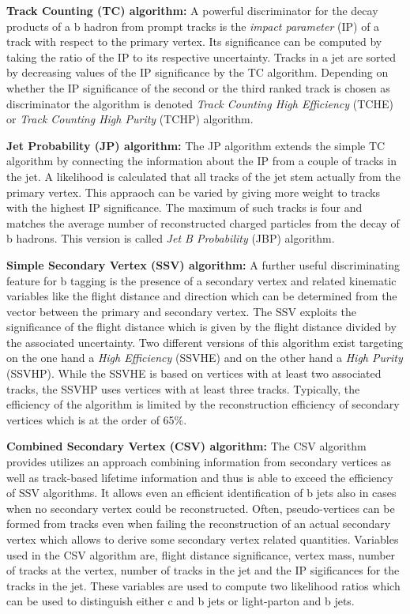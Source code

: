 \begin{description}
 \item \textbf{Track Counting (TC) algorithm:} A powerful discriminator for the decay products of a b hadron from prompt tracks is the \textit{impact parameter} (IP) of a track with respect to the primary vertex. Its significance can be computed by taking the ratio of the IP to its respective uncertainty. Tracks in a jet are sorted by decreasing values of the IP significance by the TC algorithm. Depending on whether the IP significance of the second or the third ranked track is chosen as discriminator the algorithm is denoted \textit{Track Counting High Efficiency} (TCHE) or \textit{Track Counting High Purity} (TCHP) algorithm. 
 \item \textbf{Jet Probability (JP) algorithm:} The JP algorithm extends the simple TC algorithm by connecting the information about the IP from a couple of tracks in the jet. A likelihood is calculated that all tracks of the jet stem actually from the primary vertex. This appraoch can be varied by giving more weight to tracks with the highest IP significance. The maximum of such tracks is four and matches the average number of reconstructed charged particles from the decay of b hadrons. This version is called \textit{Jet B Probability} (JBP) algorithm.
 \item \textbf{Simple Secondary Vertex (SSV) algorithm:} A further useful discriminating feature for b tagging is the presence of a secondary vertex and related kinematic variables like the flight distance and direction which can be determined from the vector between the primary and secondary vertex. The SSV exploits the significance of the flight distance which is given by the flight distance divided by the associated uncertainty. Two different versions of this algorithm exist targeting on the one hand a \textit{High Efficiency} (SSVHE) and on the other hand a \textit{High Purity} (SSVHP). While the SSVHE is based on vertices with at least two associated tracks, the SSVHP uses vertices with at least three tracks. Typically, the efficiency of the algorithm is limited by the reconstruction efficiency of secondary vertices which is at the order of 65\%.   
 \item \textbf{Combined Secondary Vertex (CSV) algorithm:} The CSV algorithm provides utilizes an approach combining information from secondary vertices as well as track-based lifetime information and thus is able to exceed the efficiency of SSV algorithms. It allows even an efficient identification of b jets also in cases when no secondary vertex could be reconstructed. Often, pseudo-vertices can be formed from tracks even when failing the reconstruction of an actual secondary vertex which allows to derive some secondary vertex related quantities. Variables used in the CSV algorithm are, \eg flight distance significance, vertex mass, number of tracks at the vertex, number of tracks in the jet and the IP sigificances for the tracks in the jet. These variables are used to compute two likelihood ratios which can be used to distinguish either c and b jets or light-parton and b jets. 
\end{description}  

